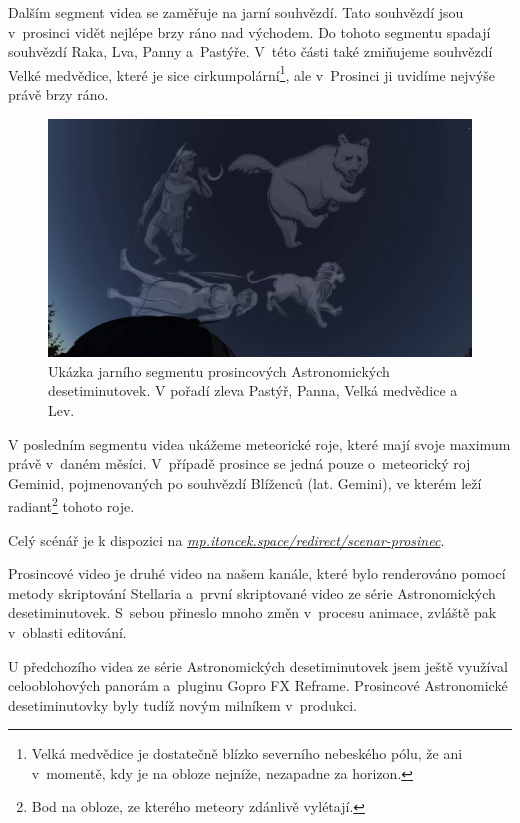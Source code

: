 \documentclass[12pt,a4paper,titlepage]{article}
\newcommand{\link}[2]{\href{#1}{\textit{#2}}}%
\begin{document}
Dalším segment videa se zaměřuje na jarní souhvězdí. Tato souhvězdí jsou v~prosinci vidět nejlépe brzy ráno nad východem. Do tohoto segmentu spadají souhvězdí Raka, Lva, Panny a~Pastýře. V~této části také zmiňujeme souhvězdí Velké medvědice, které je sice cirkumpolární\footnote{Velká medvědice je dostatečně blízko severního nebeského pólu, že ani v~momentě, kdy je na obloze nejníže, nezapadne za horizon.}, ale v~Prosinci ji uvidíme nejvýše právě brzy ráno.

\begin{figure}[H]
	\centering
	\includegraphics[width=.95\textwidth]{ac12_jaro.png}
	\caption{Ukázka jarního segmentu prosincových Astronomických desetiminutovek. V pořadí zleva Pastýř, Panna, Velká medvědice a Lev.}\label{prac:ac12_jaro}
\end{figure}

V posledním segmentu videa ukážeme meteorické roje, které mají svoje maximum právě v~daném měsíci. V~případě prosince se jedná pouze o~meteorický roj Geminid, pojmenovaných po souhvězdí Blíženců (lat. Gemini), ve kterém leží radiant\footnote{Bod na obloze, ze kterého meteory zdánlivě vylétají.} tohoto roje.

Celý scénář je k dispozici na \link{https://mp.itoncek.space/redirect/scenar-prosinec}{mp.itoncek.space/redirect/scenar-prosinec}.

Prosincové video je druhé video na našem kanále, které bylo renderováno pomocí metody skriptování Stellaria a~první skriptované video ze série Astronomických desetiminutovek. S~sebou přineslo mnoho změn v~procesu animace, zvláště pak v~oblasti editování. 

U předchozího videa ze série Astronomických desetiminutovek jsem ještě využíval celooblohových panorám a~pluginu Gopro FX Reframe. Prosincové Astronomické desetiminutovky byly tudíž novým milníkem v~produkci.
\end{document}
